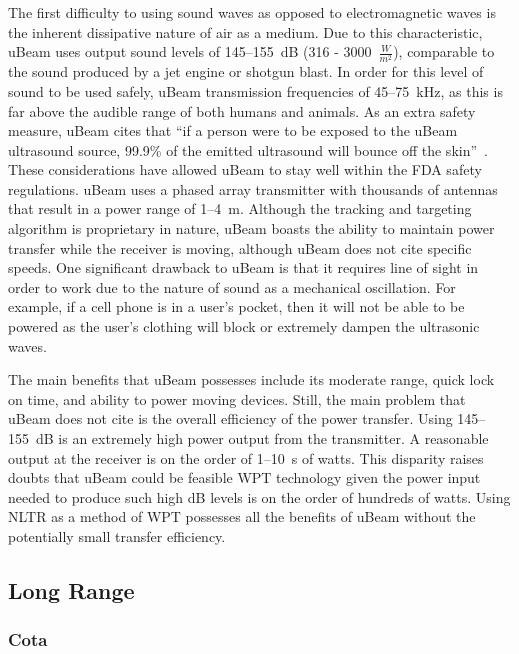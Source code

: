 The first difficulty to using sound waves as opposed  to electromagnetic waves is the inherent dissipative nature of air as a medium. Due to this characteristic, uBeam uses output sound levels of \numrange{145}{155}~dB (316 - 3000~$\frac{W}{m^2}$), comparable to the sound produced by a jet engine or shotgun blast\cite{galencarolaudio207}. In order for this level of sound to be used safely, uBeam transmission frequencies of \numrange{45}{75}~kHz, as this is far above the audible range of both humans and animals. As an extra safety measure, uBeam cites that ``if a person were to be exposed to the uBeam ultrasound source, 99.9\% of the emitted ultrasound will bounce off the skin''~\cite{ubeam2016}. These considerations have allowed uBeam to stay well within the FDA safety regulations.
uBeam uses a phased array transmitter with thousands of antennas that result in a power range of \numrange{1}{4}~m. Although the tracking and targeting algorithm is proprietary in nature, uBeam boasts the ability to maintain power transfer while the receiver is moving, although uBeam does not cite specific speeds. One significant drawback to uBeam is that it requires line of sight in order to work due to the nature of sound as a mechanical oscillation. For example, if a cell phone is in a user's pocket, then it will not be able to be powered as the user's clothing will block or extremely dampen the ultrasonic waves.

The main benefits that uBeam possesses include its moderate range, quick lock on time, and ability to power moving devices. Still, the main problem that uBeam does not cite is the overall efficiency of the power transfer. Using \numrange{145}{155}~dB is an extremely high power output from the transmitter. A reasonable output at the receiver is on the order of \numrange{1}{10}~s of watts. This disparity raises doubts that uBeam could be feasible WPT technology given the power input needed to produce such high dB levels is on the order of hundreds of watts. Using NLTR as a method of WPT possesses all the benefits of uBeam without the potentially small transfer efficiency.

\subsection{Long Range}

\subsubsection{Cota}

